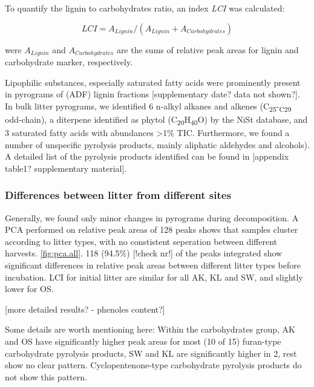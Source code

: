 To quantify the lignin to carbohydrates ratio, an index \emph{LCI} was calculated: 

\begin{equation}
LCI = A_{Lignin} / (A_{Lignin} + A_{Carbohydrates})
\end{equation}

were $A_{Lignin}$ and $A_{Carbohydrates}$ are the sums of relative peak areas for lignin and carbohydrate marker, respectively.

Lipophilic substances, especially saturated fatty acids were prominently present in pyrograms of (ADF) lignin fractions [supplementary date? data not shown?]. In bulk litter pyrograms, we identified 6 n-alkyl alkanes and alkenes (C\textsubscript{25}-\textsubscript{C29} odd-chain), a diterpene identified as phytol (C\textsubscript{20}H\textsubscript{40}O) by the NiSt database, and 3 saturated fatty acids with abundances \textgreater 1\% TIC. Furthermore, we found a number of unspecific pyrolysis products, mainly aliphatic aldehydes and alcohols). A detailed list of the pyrolysis products identified can be found in [appendix table1? supplementary material].

\subsubsection{Differences between litter from different sites}

Generally, we found only minor changes in pyrograms during decomposition. A PCA performed on relative peak areas of 128 peaks shows that samples cluster according to litter types, with no constistent seperation between different harvests. \ref{fig:pca.all}. 118 (94.5\%) [!check nr!] of the peaks integrated show significant differences in relative peak areas between different litter types before incubation. LCI for initial litter are similar for all AK, KL and SW, and slightly lower for OS.

[more detailed results? - phenoles content?]


Some details are worth mentioning here: Within the carbohydrates group, AK and OS have significantly higher peak areas for most (10 of 15) furan-type carbohydrate pyrolysis products, SW and KL are significantly higher in 2, rest show no clear pattern. Cyclopentenone-type carbohydrate pyrolysis products do not show this pattern. 

